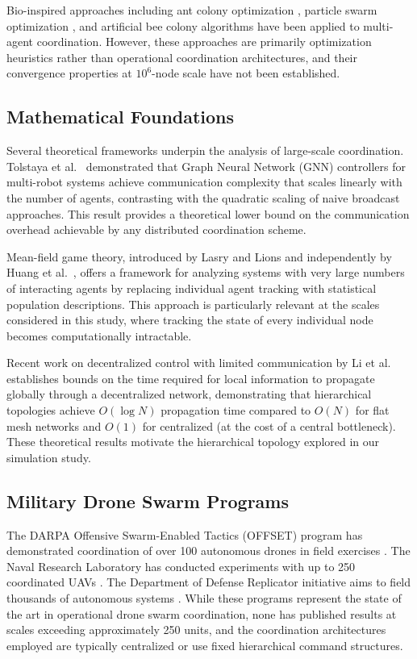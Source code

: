 \documentclass[journal]{IEEEtran}
\begin{document}
Bio-inspired approaches including ant colony optimization \cite{dorigo_aco}, particle swarm optimization \cite{kennedy_pso}, and artificial bee colony algorithms \cite{karaboga_abc} have been applied to multi-agent coordination. However, these approaches are primarily optimization heuristics rather than operational coordination architectures, and their convergence properties at $10^6$-node scale have not been established.

\subsection{Mathematical Foundations}

Several theoretical frameworks underpin the analysis of large-scale coordination. Tolstaya et al.~\cite{tolstaya_gnn} demonstrated that Graph Neural Network (GNN) controllers for multi-robot systems achieve communication complexity that scales linearly with the number of agents, contrasting with the quadratic scaling of naive broadcast approaches. This result provides a theoretical lower bound on the communication overhead achievable by any distributed coordination scheme.

Mean-field game theory, introduced by Lasry and Lions \cite{lasry_mfg} and independently by Huang et al.~\cite{huang_mfg}, offers a framework for analyzing systems with very large numbers of interacting agents by replacing individual agent tracking with statistical population descriptions. This approach is particularly relevant at the scales considered in this study, where tracking the state of every individual node becomes computationally intractable.

Recent work on decentralized control with limited communication by Li et al.~\cite{li_decentralized} establishes bounds on the time required for local information to propagate globally through a decentralized network, demonstrating that hierarchical topologies achieve $O(\log N)$ propagation time compared to $O(N)$ for flat mesh networks and $O(1)$ for centralized (at the cost of a central bottleneck). These theoretical results motivate the hierarchical topology explored in our simulation study.

\subsection{Military Drone Swarm Programs}

The DARPA Offensive Swarm-Enabled Tactics (OFFSET) program has demonstrated coordination of over 100 autonomous drones in field exercises \cite{darpa_offset}. The Naval Research Laboratory has conducted experiments with up to 250 coordinated UAVs \cite{nrl_swarm}. The Department of Defense Replicator initiative aims to field thousands of autonomous systems \cite{dod_replicator}. While these programs represent the state of the art in operational drone swarm coordination, none has published results at scales exceeding approximately 250 units, and the coordination architectures employed are typically centralized or use fixed hierarchical command structures.
\end{document}
